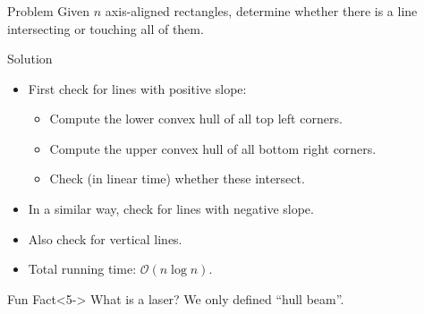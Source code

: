 \begin{frame}
    \frametitle{\problemtitle}
	\begin{block}{Problem}
        Given $n$ axis-aligned rectangles, determine whether there is a line
        intersecting or touching all of them.
    \end{block}

    \begin{block}{Solution}
        \begin{itemize}
            \item<+-> First check for lines with positive slope:
            	\begin{itemize}
            	\item Compute the lower convex hull of all top left corners.
            	\item Compute the upper convex hull of all bottom right corners.
            	\item Check (in linear time) whether these intersect.
            	\end{itemize}
            \item<+-> In a similar way, check for lines with negative slope.
            \item<+-> Also check for vertical lines.
            \item<+-> Total running time: $\mathcal{O}(n \log n)$.
        \end{itemize}
    \end{block}
    \begin{block}{Fun Fact}<5->
        What is a laser?
        \pause
        We only defined ``hull beam''.
    \end{block}
\end{frame}

